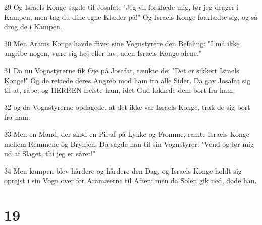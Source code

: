 \par 29 Og Israels Konge sagde til Josafat: "Jeg vil forklæde mig, før jeg drager i Kampen; men tag du dine egne Klæder på!" Og Israels Konge forklædte sig, og så drog de i Kampen.
\par 30 Men Arams Konge havde ffivet sine Vognstyrere den Befaling: "I må ikke angribe nogen, være sig høj eller lav, uden Israels Konge alene."
\par 31 Da nu Vognstyrerne fik Øje på Josafat, tænkte de: "Det er sikkert Israels Konge!" Og de rettede deres Angreb mod ham fra alle Sider. Da gav Josafat sig til at, råbe, og HERREN frelste ham, idet Gud lokkede dem bort fra ham;
\par 32 og da Vognstyrerne opdagede, at det ikke var Israels Konge, trak de sig bort fra ham.
\par 33 Men en Mand, der skød en Pil af på Lykke og Fromme, ramte Israels Konge mellem Remmene og Brynjen. Da sagde han til sin Vognstyrer: "Vend og før mig ud af Slaget, thi jeg er såret!"
\par 34 Men kampen blev hårdere og hårdere den Dag, og Israels Konge holdt sig oprejst i sin Vogn over for Aramæerne til Aften; men da Solen gik ned, døde han.

\chapter{19}

